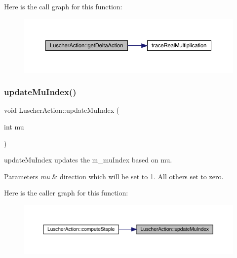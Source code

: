 Here is the call graph for this function\+:\nopagebreak
\begin{figure}[H]
\begin{center}
\leavevmode
\includegraphics[width=350pt]{class_luscher_action_a1955f8eea8b0771f6c737c39e3fc11b2_cgraph}
\end{center}
\end{figure}
\mbox{\label{class_luscher_action_a2bfa5f9b8bfb0c4440732000d2281519}} 
\subsubsection{\texorpdfstring{updateMuIndex()}{updateMuIndex()}}
{\footnotesize\ttfamily void Luscher\+Action\+::update\+Mu\+Index (\begin{DoxyParamCaption}\item[{int}]{mu }\end{DoxyParamCaption})\hspace{0.3cm}{\ttfamily [inline]}}



update\+Mu\+Index updates the m\+\_\+mu\+Index based on mu. 


\begin{DoxyParams}{Parameters}
{\em mu} & direction which will be set to 1. All others set to zero. \\
\hline
\end{DoxyParams}
Here is the caller graph for this function\+:\nopagebreak
\begin{figure}[H]
\begin{center}
\leavevmode
\includegraphics[width=350pt]{class_luscher_action_a2bfa5f9b8bfb0c4440732000d2281519_icgraph}
\end{center}
\end{figure}
\mbox{\label{class_luscher_action_a6496c97ed38401c0d94855bf940fd6ff}} 
